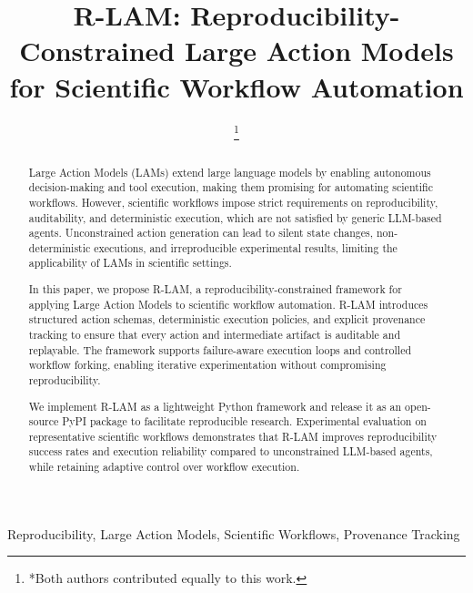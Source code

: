\documentclass[conference]{IEEEtran}
\begin{document}
\title{R-LAM: Reproducibility-Constrained Large Action Models for Scientific Workflow Automation}

\author{
    \thanks{*Both authors contributed equally to this work.}
}

\maketitle

\begin{abstract}
Large Action Models (LAMs) extend large language models by enabling autonomous decision-making and tool execution, making them promising for automating scientific workflows. However, scientific workflows impose strict requirements on reproducibility, auditability, and deterministic execution, which are not satisfied by generic LLM-based agents. Unconstrained action generation can lead to silent state changes, non-deterministic executions, and irreproducible experimental results, limiting the applicability of LAMs in scientific settings.

In this paper, we propose R-LAM, a reproducibility-constrained framework for applying Large Action Models to scientific workflow automation. R-LAM introduces structured action schemas, deterministic execution policies, and explicit provenance tracking to ensure that every action and intermediate artifact is auditable and replayable. The framework supports failure-aware execution loops and controlled workflow forking, enabling iterative experimentation without compromising reproducibility.

We implement R-LAM as a lightweight Python framework and release it as an open-source PyPI package to facilitate reproducible research. Experimental evaluation on representative scientific workflows demonstrates that R-LAM improves reproducibility success rates and execution reliability compared to unconstrained LLM-based agents, while retaining adaptive control over workflow execution.
\end{abstract}

\begin{IEEEkeywords}
Reproducibility, Large Action Models, Scientific Workflows, Provenance Tracking
\end{IEEEkeywords}
\end{document}
